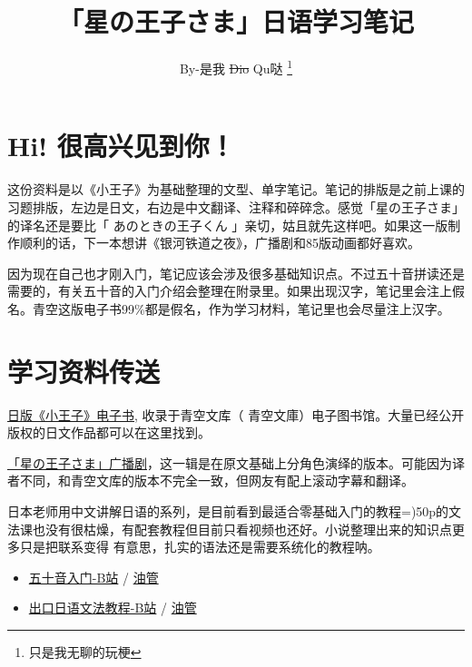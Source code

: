 


\title[「星の王子さま」]{「星の王子さま」日语学习笔记}
\author{By-是我 \sout{Dio} Qu哒
\thanks{只是我无聊的玩梗}}


  \maketitle

\thispagestyle{plain}
\fancyfoot[C]{\thepage}

\section*{\bf{Hi! 很高兴见到你！}}
这份资料是以《小王子》为基础整理的文型、单字笔记。笔记的排版是之前上课的习题排版，左边是日文，右边是中文翻译、注释和碎碎念。感觉「星の王子さま」的译名还是要比「 あのときの王子くん 」亲切，姑且就先这样吧。如果这一版制作顺利的话，下一本想讲《银河铁道之夜》，广播剧和85版动画都好喜欢。

因为现在自己也才刚入门，笔记应该会涉及很多基础知识点。不过五十音拼读还是需要的，有关五十音的入门介绍会整理在附录里。如果出现汉字，笔记里会注上假名。青空这版电子书99\%都是假名，作为学习材料，笔记里也会尽量注上汉字。

\section*{\bf{学习资料传送}}

    \parStar \href{https://www.aozora.gr.jp/cards/001265/files/46817_24670.html}{日版《小王子》电子书}, 收录于青空文库（{ 青空文庫}）电子图书馆。大量已经公开版权的日文作品都可以在这里找到。
    
    \parStar \href{https://music.163.com/#/album?id=3139032}{「星の王子さま」广播剧}，这一辑是在原文基础上分角色演绎的版本。可能因为译者不同，和青空文库的版本不完全一致，但网友有配上滚动字幕和翻译。
    
    \parStar 日本老师用中文讲解日语的系列，是目前看到最适合零基础入门的教程=)50p的文法课也没有很枯燥，有配套教程但目前只看视频也还好。小说整理出来的知识点更多只是把联系变得 有意思，扎实的语法还是需要系统化的教程呐。
    \begin{itemize}
        \setlength\itemsep{0.5em}
        
        \item \href{https://www.bilibili.com/video/BV1mt411M7Uy/?p=6}{五十音入门-B站} / \href{https://www.youtube.com/playlist?list=PLynCeSdpMqxBipKl9EHnBzZFzBnGuB108}{油管}
        
        \item \href{https://www.bilibili.com/video/BV1NJ41187DK?t=48}{出口日语文法教程-B站} / \href{https://www.youtube.com/playlist?list=PLynCeSdpMqxCW-AfMtmIlASAMUVq8wX6k}{油管}
        
    \end{itemize}
    
